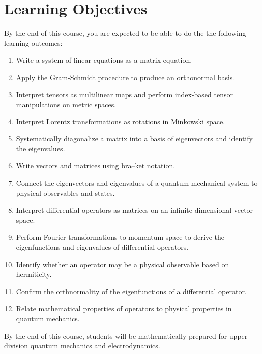 \documentclass[12pt]{article}
\numberwithin{equation}{section}    %
\begin{document}



\section{Learning Objectives}

By the end of this course, you are expected to be able to do the the following learning outcomes:
\begin{enumerate}
	\item Write a system of linear equations as a matrix equation.
	\item Apply the Gram-Schmidt procedure to produce an orthonormal basis.
	\item Interpret tensors as multilinear maps and perform index-based tensor manipulations on metric spaces.
	\item Interpret Lorentz transformations as rotations in Minkowski space.
	\item Systematically diagonalize a matrix into a basis of eigenvectors and identify the eigenvalues.
	\item Write vectors and matrices using bra--ket notation.
 	\item Connect the eigenvectors and eigenvalues of a quantum mechanical system to physical observables and states.
 	\item Interpret differential operators as matrices on an infinite dimensional vector space.
	\item Perform Fourier transformations to momentum space to derive the eigenfunctions and eigenvalues of differential operators. 
	\item Identify whether an operator may be a physical observable based on hermiticity.
	\item Confirm the orthnormality of the eigenfunctions of a differential operator.
	\item Relate mathematical properties of operators to physical properties in quantum mechanics.
\end{enumerate}

\noindent By the end of this course, students will be mathematically prepared for upper-division quantum mechanics and electrodynamics.



\end{document}
